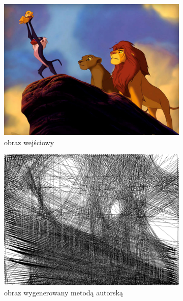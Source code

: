	\begin{figure}[H] 
    \centering
    \begin{subfigure}{0.40\textwidth}
        \centering
        \includegraphics[width = \textwidth]{img/7-sum/simba.jpg}
        \caption{obraz wejściowy}
        \label{sum-dev-simba-a}
    \end{subfigure}
    \begin{subfigure}{0.40\textwidth}
        \centering
        \includegraphics[width = \textwidth]{img/7-sum/simba_r_i1500_c15_inv0_bg5_obj2_ed1.png}
        \caption{obraz wygenerowany metodą autorską}
        \label{sum-dev-simba-b}
    \end{subfigure}
    \begin{subfigure}{0.40\textwidth}

\end{subfigure}
\end{figure}
